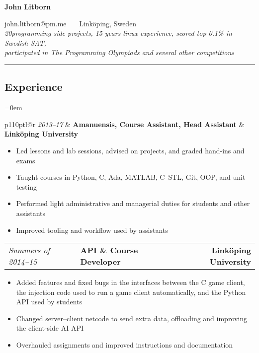 \documentclass[10pt,letterpaper]{article}
\makeatletter
\newcommand{\headerrow}[2]
{\begin{tabular*}{\linewidth}{l@{\extracolsep{\fill}}r}
    #1 &
    #2 \\
\end{tabular*}}
\newcommand{\threeheaderrow}[3]
{\begin{tabular*}{\linewidth}{p{110pt}l@{\extracolsep{\fill}}r}
    #1 &
    #2 &
    #3 \\
\end{tabular*}}
\newcommand{\CPP}
{C\nolinebreak[4]\hspace{-.05em}\raisebox{.22ex}{\footnotesize\bf ++}}
\newcommand{\PLUS}
{\nolinebreak[4]\hspace{-.05em}\raisebox{.22ex}{\footnotesize\bf +}}
\makeatother
\begin{document}
\begin{center}
    {\LARGE \textbf{John Litborn}}

    john.litborn@pm.me
    \ \textbullet \ \
    Linköping, Sweden
\\
\vspace{0.4em}
            \emph{20\PLUS programming side projects, 15 years linux experience, scored top 0.1\% in Swedish SAT, \\ participated in The Programming Olympiads and several other competitions}

\end{center}
\hrule
\vspace{-0.4em}

\subsection*{Experience}

\parindent=0em
\threeheaderrow
{\emph{2013--17}}
{\textbf{Amanuensis, Course Assistant, Head Assistant}}
{\textbf{Linköping University}}
\begin{itemize}[noitemsep, topsep=1pt]
    \item Led lessons and lab sessions, advised on projects, and graded
        hand-ins and exams
    \item Taught courses in Python, \CPP, Ada, MATLAB,
        \CPP \ STL, Git, OOP,
        and unit testing
    \item Performed light administrative and managerial duties for students
        and other assistants
    \item Improved tooling and workflow used by assistants
\end{itemize}
\vspace{0.5em}
\threeheaderrow
{\emph{Summers of 2014--15}}
{\textbf{API \& Course Developer}}
{\textbf{Linköping University}}
\begin{itemize}[noitemsep, topsep=1pt]
    \item Added features and fixed bugs in the interfaces
        between the C game client, the injection code used to run a game
        client automatically, and the Python API used by students
    \item Changed server--client netcode to send extra data, offloading and
        improving the client-side AI API
    \item Overhauled assignments and improved instructions and
        documentation
\end{itemize}
\vspace{0.5em}
\end{document}

